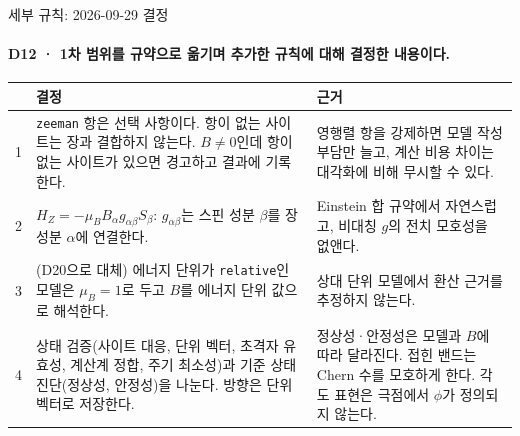 \begin{frame}[label=detail-rules]{세부 규칙: 2026-09-29 결정}
  \framesubtitle{D12 · 1차 범위를 규약으로 옮기며 추가한 규칙에 대해 결정한 내용이다.}
  \small
  \begin{tabularx}{\textwidth}{@{}p{0.4cm}YP{4.9cm}@{}}
    \toprule
    & 결정 & 근거 \\
     & \texttt{zeeman} 항은 선택 사항이다. 항이 없는 사이트는 장과 결합하지 않는다.
      $B\neq0$인데 항이 없는 사이트가 있으면 경고하고 결과에 기록한다.
      & 영행렬 항을 강제하면 모델 작성 부담만 늘고, 계산 비용 차이는 대각화에 비해 무시할 수 있다. \\
    2 & $H_Z=-\mu_B B_\alpha g_{\alpha\beta}S_\beta$: $g_{\alpha\beta}$는 스핀 성분 $\beta$를 장 성분 $\alpha$에 연결한다.
      & Einstein 합 규약에서 자연스럽고, 비대칭 $g$의 전치 모호성을 없앤다. \\
    3 & (D20으로 대체) 에너지 단위가 \texttt{relative}인 모델은 $\mu_B=1$로 두고 $B$를 에너지 단위 값으로 해석한다.
      & 상대 단위 모델에서 환산 근거를 추정하지 않는다. \\
    4 & 상태 검증(사이트 대응, 단위 벡터, 초격자 유효성, 계산계 정합, 주기 최소성)과
      기준 상태 진단(정상성, 안정성)을 나눈다. 방향은 단위 벡터로 저장한다.
      & 정상성·안정성은 모델과 $B$에 따라 달라진다. 접힌 밴드는 Chern 수를 모호하게 한다.
      각도 표현은 극점에서 $\phi$가 정의되지 않는다. \\
    \bottomrule
  \end{tabularx}
  \par\medskip
\end{frame}

